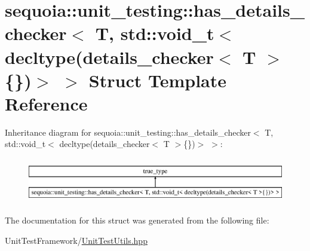 \hypertarget{structsequoia_1_1unit__testing_1_1has__details__checker_3_01_t_00_01std_1_1void__t_3_01decltype_7c6067a34e19675cf336ea8dff44d78b}{}\section{sequoia\+::unit\+\_\+testing\+::has\+\_\+details\+\_\+checker$<$ T, std\+::void\+\_\+t$<$ decltype(details\+\_\+checker$<$ T $>$\{\})$>$ $>$ Struct Template Reference}
\label{structsequoia_1_1unit__testing_1_1has__details__checker_3_01_t_00_01std_1_1void__t_3_01decltype_7c6067a34e19675cf336ea8dff44d78b}
Inheritance diagram for sequoia\+::unit\+\_\+testing\+::has\+\_\+details\+\_\+checker$<$ T, std\+::void\+\_\+t$<$ decltype(details\+\_\+checker$<$ T $>$\{\})$>$ $>$\+:\begin{figure}[H]
\begin{center}
\leavevmode
\includegraphics[height=2.000000cm]{structsequoia_1_1unit__testing_1_1has__details__checker_3_01_t_00_01std_1_1void__t_3_01decltype_7c6067a34e19675cf336ea8dff44d78b}
\end{center}
\end{figure}


The documentation for this struct was generated from the following file\+:\begin{DoxyCompactItemize}
\item 
Unit\+Test\+Framework/\mbox{\hyperlink{_unit_test_utils_8hpp}{Unit\+Test\+Utils.\+hpp}}\end{DoxyCompactItemize}
